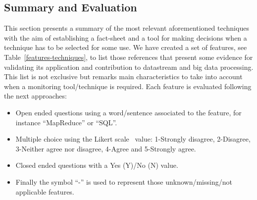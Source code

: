 \subsection{Summary and Evaluation}
This section presents a summary of the most relevant aforementioned techniques with the aim
of establishing a fact-sheet and a tool for making decisions when a technique 
has to be selected for some use. We have created a set of features, see Table~\ref{features-techniques}, 
to list those references that present some evidence for validating its application 
and contribution to datastream and big data processing. This list is not exclusive 
but remarks main characteristics to take into account when a monitoring tool/technique 
is required. Each feature is evaluated following the next approaches:
\begin{itemize}
 \item Open ended questions using a word/sentence associated to the feature, for instance ``MapReduce'' or ``SQL''.
 \item Multiple choice using the Likert scale~\cite{albaum1997likert} value: 1-Strongly disagree, 2-Disagree, 3-Neither agree nor disagree, 4-Agree and 5-Strongly agree.
 \item Closed ended questions with a Yes (Y)/No (N) value.
 \item Finally the symbol ``-'' is used to represent those unknown/missing/not applicable features.
\end{itemize}


